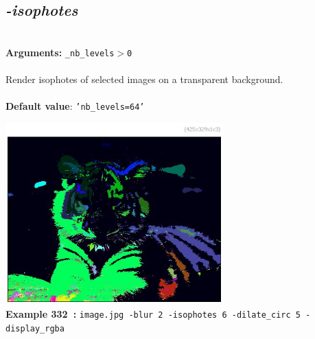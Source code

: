 \documentclass[a4paper,11pt,twoside]{book}
\begin{document}
\subsection{\emph{-isophotes} }\vspace*{-0.5em}
~\\\textbf{Arguments: } 
{\small \texttt{\_nb\_levels$>$0}}\\~\\
Render isophotes of selected images on a transparent background.
~\\~\\\textbf{Default value}: {\small \texttt{'nb\_levels=64'}}
\begin{center}\includegraphics[keepaspectratio=true,height=7cm,width=\textwidth]{img/gmic_def332.jpg}\\
{\footnotesize \textbf{Example 332~:} \texttt{image.jpg -blur 2 -isophotes 6 -dilate\_circ 5 -display\_rgba}}
\end{center}
\end{document}
